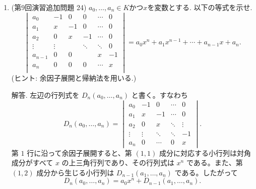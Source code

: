 \documentclass[dvipdfmx,a4paper,11pt]{article} %
\theoremstyle{definition}
\begin{document}
\begin{enumerate}[label=\textbf{問題}\arabic*.]
解答. 係数行列を
\[
M(\lambda)=
\begin{pmatrix}
1&0&-1\\
2&\lambda&-1\\
\lambda+1&1&\lambda
\end{pmatrix}
\]
とおく。斉次連立一次方程式が自明でない解を持つことと、係数行列が正則でないことは同値である。したがって、求める条件は
\[
\det M(\lambda)=0
\]
である。

第 $1$ 行で展開すると、
\begin{align*}
\det M(\lambda)
&=
\begin{vmatrix}
\lambda&-1\\
1&\lambda
\end{vmatrix}
-
\begin{vmatrix}
2&\lambda\\
\lambda+1&1
\end{vmatrix}\\
&=(\lambda^2+1)-\{2-\lambda(\lambda+1)\}\\
&=2\lambda^2+\lambda-1\\
&=(\lambda+1)(2\lambda-1).
\end{align*}
よって
\[
(\lambda+1)(2\lambda-1)=0
\]
であり、
\[
\boxed{\lambda=-1,\ \frac12}
\]
である。

\item (第9回演習追加問題 24) $a_0, \ldots, a_n \in K$かつ$x$を変数とする. 
 以下の等式を示せ. 
 $$
 \begin{vmatrix}
a_0   &   -1   &0 &0 & \cdots &  0 \\
a_1   &   x    &-1  &0 & \cdots &  0 \\
a_2   &   0    & x   &-1 & \cdots &  0 \\
\vdots  &    \vdots   &   &\ddots & \ddots &  0 \\
a_{n-1}&   0    & 0   &                  & x&  -1\\
a_n   &   0   & 0   &0 & \cdots &  x\\
\end{vmatrix}
=a_0 x^{n} +  a_1 x^{n-1} +  \cdots +  a_{n-1} x + a_{n}.
$$
(ヒント: 余因子展開と帰納法を用いる.)

解答. 左辺の行列式を $D_n(a_0,\ldots,a_n)$ と書く。すなわち
\[
D_n(a_0,\ldots,a_n)
=
\begin{vmatrix}
a_0&-1&0&\cdots&0\\
a_1&x&-1&\cdots&0\\
a_2&0&x&\ddots&\vdots\\
\vdots&\vdots&\ddots&\ddots&-1\\
a_n&0&\cdots&0&x
\end{vmatrix}.
\]
第 $1$ 行に沿って余因子展開すると、第 $(1,1)$ 成分に対応する小行列は対角成分がすべて $x$ の上三角行列であり、その行列式は $x^n$ である。また、第 $(1,2)$ 成分から生じる小行列は $D_{n-1}(a_1,\ldots,a_n)$ である。したがって
\[
D_n(a_0,\ldots,a_n)
=a_0x^n+D_{n-1}(a_1,\ldots,a_n).
\]


\end{enumerate}
\end{document}

